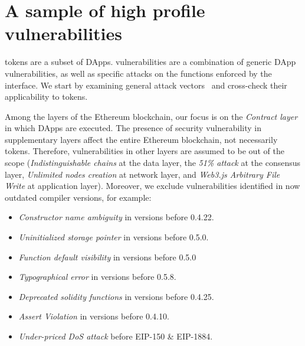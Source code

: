 

\section{A sample of high profile vulnerabilities}\label{sec:vul}
\erc tokens are a subset of DApps. \erc vulnerabilities are a combination of generic DApp vulnerabilities, as well as specific attacks on the functions enforced by the \erc interface. We start by examining general attack vectors~\cite{SolidtySecBlog,EthSecServ,SoliditySecCon,ConsensysSecCon,LandoKL} and cross-check their applicability to \erc tokens.

Among the layers of the Ethereum blockchain, our focus is on the \textit{Contract layer} in which DApps are executed. The presence of security vulnerability in supplementary layers affect the entire Ethereum blockchain, not necessarily \erc tokens. Therefore, vulnerabilities in other layers are assumed to be out of the scope (\eg \textit{Indistinguishable chains} at the data layer, the \textit{51\% attack} at the consensus layer, \textit{Unlimited nodes creation} at network layer, and \textit{Web3.js Arbitrary File Write} at application layer). Moreover, we exclude vulnerabilities identified in now outdated compiler versions, for example:

\begin{itemize}
	\item \textit{Constructor name ambiguity} in versions before 0.4.22.
	\item \textit{Uninitialized storage pointer} in versions before 0.5.0.
	\item \textit{Function default visibility} in versions before 0.5.0
	\item \textit{Typographical error} in versions before 0.5.8.
	\item \textit{Deprecated solidity functions} in versions before 0.4.25.
	\item \textit{Assert Violation} in versions before 0.4.10.
	\item \textit{Under-priced DoS attack} before EIP-150 \& EIP-1884.
\end{itemize}

